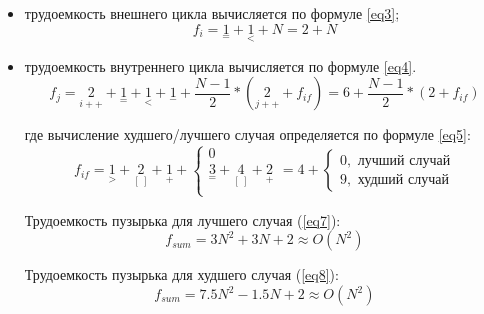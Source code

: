 \begin{itemize}
	\item трудоемкость внешнего цикла вычисляется по формуле \ref{eq3};
	\begin{equation}
		\label{eq3} 
		f_{i} = {\underset{=}{1}} + {\underset{<}{1}} + N= 2 + N
	\end{equation}

	\item трудоемкость внутреннего цикла вычисляется по формуле \ref{eq4}.
	\begin{equation}
		\label{eq4} 
		f_{j} = {\underset{i++}{2}} + {\underset{=}{1}} + {\underset{<}{1}} + {\underset{-}{1}} +
				\frac{N-1}{2}*({\underset{j++}{2}} + f_{if}) = 6 + \frac{N-1}{2}*(2 + f_{if})
	\end{equation}

	где вычисление худшего/лучшего случая определяется по формуле \ref{eq5}:
	 \begin{equation}
	 	\label{eq5}
	 	f_{if} = {\underset{>}{1}} + {\underset{[\ ]}{2}} + {\underset{+}{1}} +
	 	\begin{cases}
	 		0\\
	 		{\underset{=}{3}} + {\underset{[\ ]}{4}} +{\underset{+}{2}}\\
	 	\end{cases}
 		= 4 +
 		\begin{cases}
 			0, \text{  лучший случай}\\
 			9, \text{  худший случай}
 		\end{cases}
	 \end{equation}
 	
 	Трудоемкость пузырька для лучшего случая (\ref{eq7}):
 	\begin{equation}
 		\label{eq7}
 		f_{sum} = 3N^2 + 3N + 2 \approx O(N^2)
 	\end{equation}
 
	 Трудоемкость пузырька для худшего случая (\ref{eq8}):
	 \begin{equation}
	 	\label{eq8}
	 	f_{sum} = 7.5N^2 - 1.5N + 2 \approx O(N^2)
	 \end{equation}

\end{itemize}
